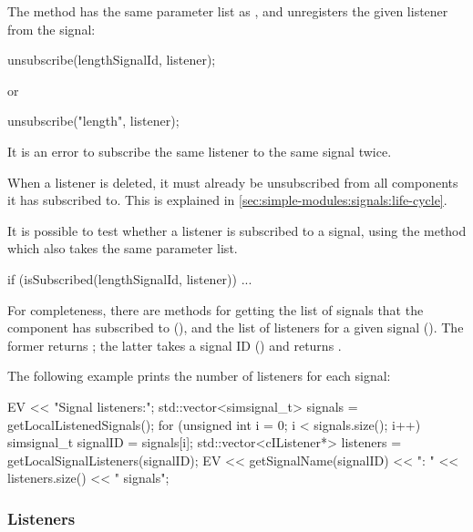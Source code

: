 The  method has the same parameter list
as , and unregisters the given listener
from the signal:

\begin{cpp}
unsubscribe(lengthSignalId, listener);
\end{cpp}

or

\begin{cpp}
unsubscribe("length", listener);
\end{cpp}

It is an error to subscribe the same listener to the same
signal twice.

\begin{note}
  When a listener is deleted, it must already be unsubscribed from
  all components it has subscribed to. This is explained in
  \ref{sec:simple-modules:signals:life-cycle}.
\end{note}

It is possible to test whether a listener is subscribed to a signal,
using the  method which also takes the same
parameter list.

\begin{cpp}
if (isSubscribed(lengthSignalId, listener))
{
    ...
}
\end{cpp}

For completeness, there are methods for getting the list of signals
that the component has subscribed to (),
and the list of listeners for a given signal ().
The former returns ; the latter takes
a signal ID () and returns .

The following example prints the number of listeners for each signal:

\begin{cpp}
EV << "Signal listeners:\n";
std::vector<simsignal_t> signals = getLocalListenedSignals();
for (unsigned int i = 0; i < signals.size(); i++) {
    simsignal_t signalID = signals[i];
    std::vector<cIListener*> listeners = getLocalSignalListeners(signalID);
    EV << getSignalName(signalID) << ": " << listeners.size() << " signals\n";
}
\end{cpp}

\subsubsection{Listeners}

